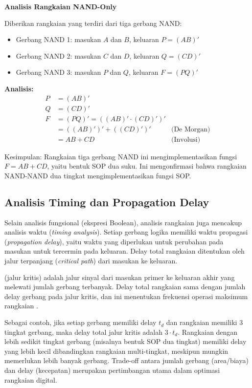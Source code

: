\begin{contoh}
\textbf{Analisis Rangkaian NAND-Only}

Diberikan rangkaian yang terdiri dari tiga gerbang NAND:
\begin{itemize}
    \item Gerbang NAND 1: masukan $A$ dan $B$, keluaran $P = (AB)'$
    \item Gerbang NAND 2: masukan $C$ dan $D$, keluaran $Q = (CD)'$
    \item Gerbang NAND 3: masukan $P$ dan $Q$, keluaran $F = (PQ)'$
\end{itemize}

\textbf{Analisis:}
\begin{align*}
P &= (AB)' \\
Q &= (CD)' \\
F &= (PQ)' = ((AB)' \cdot (CD)')' \\
  &= ((AB)')' + ((CD)')' & \text{(De Morgan)} \\
  &= AB + CD & \text{(Involusi)}
\end{align*}

Kesimpulan: Rangkaian tiga gerbang NAND ini mengimplementasikan fungsi $F = AB + CD$, yaitu bentuk SOP dua suku. Ini mengonfirmasi bahwa rangkaian NAND-NAND dua tingkat mengimplementasikan fungsi SOP.
\end{contoh}

\subsection{Analisis Timing dan Propagation Delay}

Selain analisis fungsional (ekspresi Boolean), analisis rangkaian juga mencakup analisis waktu (\textit{timing analysis}). Setiap gerbang logika memiliki waktu propagasi (\textit{propagation delay}), yaitu waktu yang diperlukan untuk perubahan pada masukan untuk tercermin pada keluaran. Delay total rangkaian ditentukan oleh jalur terpanjang (\textit{critical path}) dari masukan ke keluaran.

\begin{definisi}
 (jalur kritis) adalah jalur sinyal dari masukan primer ke keluaran akhir yang melewati jumlah gerbang terbanyak. Delay total rangkaian sama dengan jumlah delay gerbang pada jalur kritis, dan ini menentukan frekuensi operasi maksimum rangkaian \cite{electronics_tutorials_gates}.
\end{definisi}

Sebagai contoh, jika setiap gerbang memiliki delay $t_d$ dan rangkaian memiliki 3 tingkat gerbang, maka delay total jalur kritis adalah $3 \cdot t_d$. Rangkaian dengan lebih sedikit tingkat gerbang (misalnya bentuk SOP dua tingkat) memiliki delay yang lebih kecil dibandingkan rangkaian multi-tingkat, meskipun mungkin memerlukan lebih banyak gerbang. Trade-off antara jumlah gerbang (area/biaya) dan delay (kecepatan) merupakan pertimbangan utama dalam optimasi rangkaian digital.

